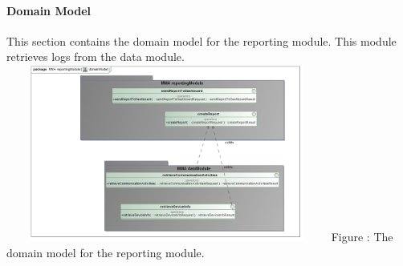 \documentclass[hidelinks, 12pt, oneside]{article}
\begin{document}
			\paragraph{Domain Model}
			This section contains the domain model for the reporting module. This module retrieves logs from the data module. 
			\includegraphics[width=400px,height=220px]{img/domainModelReportModule.jpg}
			     Figure : The domain model for the reporting module.\newline
			  
		
\end{document}
